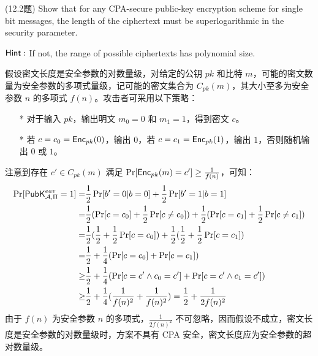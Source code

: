 \begin{questions}
    \question (12.2题) Show that for any CPA-secure public-key encryption scheme for single bit messages, the length of the ciphertext must be superlogarithmic in the security parameter.

        \begin{center}
            $\mathsf{Hint:}$ If not, the range of possible ciphertexts has polynomial size.
        \end{center}

        \begin{solution}
            \newline
            假设密文长度是安全参数的对数量级，对给定的公钥 $pk$ 和比特 $m$，可能的密文数量为安全参数的多项式量级，记可能的密文集合为 $C_{pk}(m)$，其大小至多为安全参数 $n$ 的多项式 $f(n)$。攻击者可采用以下策略：
            \begin{enumerate}
                \item[*] 对于输入 $pk$，输出明文 $m_0=0$ 和 $m_1=1$，得到密文 $c$。
                \item[*] 若 $c=c_0=\mathsf{Enc}_{pk}(0)$，输出 $0$，若 $c=c_1=\mathsf{Enc}_{pk}(1)$，输出 $1$，否则随机输出 $0$ 或 $1$。
            \end{enumerate}
            注意到存在 $c'\in{C}_{pk}(m)$ 满足 $\Pr[\mathsf{Enc}_{pk}(m)=c']\geq\frac{1}{f(n)}$，可知：
            \begin{equation}
                \begin{aligned}
                    \Pr[\mathsf{PubK}^{eav}_{\mathcal{A},\Pi}=1]=&\frac{1}{2}\Pr[b'=0|b=0]+\frac{1}{2}\Pr[b'=1|b=1]\\
                    =&\frac{1}{2}(\Pr[c=c_0]+\frac{1}{2}\Pr[c\neq{c}_0])+\frac{1}{2}(\Pr[c=c_1]+\frac{1}{2}\Pr[c\neq{c}_1])\\
                    =&\frac{1}{2}(\frac{1}{2}+\frac{1}{2}\Pr[c=c_0])+\frac{1}{2}(\frac{1}{2}+\frac{1}{2}\Pr[c=c_1])\\
                    =&\frac{1}{2}+\frac{1}{4}(\Pr[c=c_0]+\Pr[c=c_1])\\
                    \geq&\frac{1}{2}+\frac{1}{4}(\Pr[c=c'\wedge{c}_0=c']+\Pr[c=c'\wedge{c}_1=c'])\\
                    \geq&\frac{1}{2}+\frac{1}{4}(\frac{1}{f(n)^2}+\frac{1}{f(n)^2})=\frac{1}{2}+\frac{1}{2f(n)^2}
                \end{aligned}
            \end{equation}
            由于 $f(n)$ 为安全参数 $n$ 的多项式，$\frac{1}{2f(n)^2}$ 不可忽略，因而假设不成立，密文长度是安全参数的对数量级时，方案不具有 CPA 安全，密文长度应为安全参数的超对数量级。
        \end{solution}


\end{questions}
